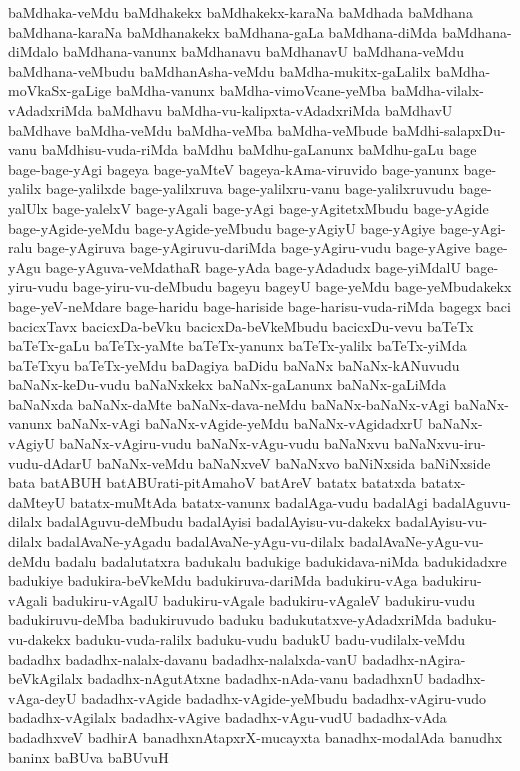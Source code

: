 {baMdhaka-veMdu
baMdhakekx
baMdhakekx-karaNa
baMdhada
baMdhana
baMdhana-karaNa
baMdhanakekx
baMdhana-gaLa
baMdhana-diMda
baMdhana-diMdalo
baMdhana-vanunx
baMdhanavu
baMdhanavU
baMdhana-veMdu
baMdhana-veMbudu
baMdhanAsha-veMdu
baMdha-mukitx-gaLalilx
baMdha-moVkaSx-gaLige
baMdha-vanunx
baMdha-vimoVcane-yeMba
baMdha-vilalx-vAdadxriMda
baMdhavu
baMdha-vu-kalipxta-vAdadxriMda
baMdhavU
baMdhave
baMdha-veMdu
baMdha-veMba
baMdha-veMbude
baMdhi-salapxDu-vanu
baMdhisu-vuda-riMda
baMdhu
baMdhu-gaLanunx
baMdhu-gaLu
bage
bage-bage-yAgi
bageya
bage-yaMteV
bageya-kAma-viruvido
bage-yanunx
bage-yalilx
bage-yalilxde
bage-yalilxruva
bage-yalilxru-vanu
bage-yalilxruvudu
bage-yalUlx
bage-yalelxV
bage-yAgali
bage-yAgi
bage-yAgitetxMbudu
bage-yAgide
bage-yAgide-yeMdu
bage-yAgide-yeMbudu
bage-yAgiyU
bage-yAgiye
bage-yAgi-ralu
bage-yAgiruva
bage-yAgiruvu-dariMda
bage-yAgiru-vudu
bage-yAgive
bage-yAgu
bage-yAguva-veMdathaR
bage-yAda
bage-yAdadudx
bage-yiMdalU
bage-yiru-vudu
bage-yiru-vu-deMbudu
bageyu
bageyU
bage-yeMdu
bage-yeMbudakekx
bage-yeV-neMdare
bage-haridu
bage-hariside
bage-harisu-vuda-riMda
bagegx
baci
bacicxTavx
bacicxDa-beVku
bacicxDa-beVkeMbudu
bacicxDu-vevu
baTeTx
baTeTx-gaLu
baTeTx-yaMte
baTeTx-yanunx
baTeTx-yalilx
baTeTx-yiMda
baTeTxyu
baTeTx-yeMdu
baDagiya
baDidu
baNaNx
baNaNx-kANuvudu
baNaNx-keDu-vudu
baNaNxkekx
baNaNx-gaLanunx
baNaNx-gaLiMda
baNaNxda
baNaNx-daMte
baNaNx-dava-neMdu
baNaNx-baNaNx-vAgi
baNaNx-vanunx
baNaNx-vAgi
baNaNx-vAgide-yeMdu
baNaNx-vAgidadxrU
baNaNx-vAgiyU
baNaNx-vAgiru-vudu
baNaNx-vAgu-vudu
baNaNxvu
baNaNxvu-iru-vudu-dAdarU
baNaNx-veMdu
baNaNxveV
baNaNxvo
baNiNxsida
baNiNxside
bata
batABUH
batABUrati-pitAmahoV
batAreV
batatx
batatxda
batatx-daMteyU
batatx-muMtAda
batatx-vanunx
badalAga-vudu
badalAgi
badalAguvu-dilalx
badalAguvu-deMbudu
badalAyisi
badalAyisu-vu-dakekx
badalAyisu-vu-dilalx
badalAvaNe-yAgadu
badalAvaNe-yAgu-vu-dilalx
badalAvaNe-yAgu-vu-deMdu
badalu
badalutatxra
badukalu
badukige
badukidava-niMda
badukidadxre
badukiye
badukira-beVkeMdu
badukiruva-dariMda
badukiru-vAga
badukiru-vAgali
badukiru-vAgalU
badukiru-vAgale
badukiru-vAgaleV
badukiru-vudu
badukiruvu-deMba
badukiruvudo
baduku
badukutatxve-yAdadxriMda
baduku-vu-dakekx
baduku-vuda-ralilx
baduku-vudu
badukU
badu-vudilalx-veMdu
badadhx
badadhx-nalalx-davanu
badadhx-nalalxda-vanU
badadhx-nAgira-beVkAgilalx
badadhx-nAgutAtxne
badadhx-nAda-vanu
badadhxnU
badadhx-vAga-deyU
badadhx-vAgide
badadhx-vAgide-yeMbudu
badadhx-vAgiru-vudo
badadhx-vAgilalx
badadhx-vAgive
badadhx-vAgu-vudU
badadhx-vAda
badadhxveV
badhirA
banadhxnAtapxrX-mucayxta
banadhx-modalAda
banudhx
baninx
baBUva
baBUvuH
}
